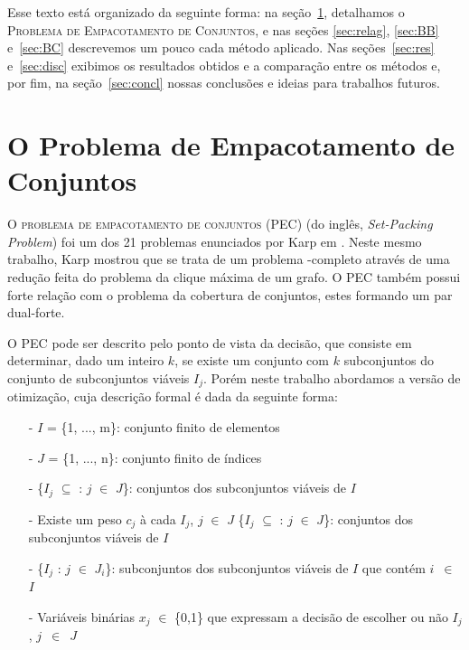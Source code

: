 \documentclass{article}
\begin{document}
	Esse texto está organizado da seguinte forma: na seção~\ref{sec:prob}, detalhamos o \textsc{Problema de Empacotamento de Conjuntos}, e nas seções \ref{sec:relag}, \ref{sec:BB} e~\ref{sec:BC} descrevemos um pouco cada método aplicado. Nas seções~\ref{sec:res} e~\ref{sec:disc} exibimos os resultados obtidos e a comparação entre os métodos e, por fim, na seção~\ref{sec:concl} nossas conclusões e ideias para trabalhos futuros.
	
	
	\section{O Problema de Empacotamento de Conjuntos}\label{sec:prob}
	O \textsc{problema de empacotamento de conjuntos} (PEC) (do inglês, \emph{Set-Packing Problem}) foi um dos 21 problemas enunciados por Karp em \cite{Karp}. Neste mesmo trabalho, Karp mostrou que se trata de um problema \NP-completo através de uma redução feita do problema da clique máxima de um grafo. O PEC também possui forte relação com o problema da cobertura de conjuntos, estes formando um par dual-forte.
	
	O PEC pode ser descrito pelo ponto de vista da decisão, que consiste em determinar, dado um inteiro $k$, se existe um conjunto com $k$ subconjuntos do conjunto de subconjuntos viáveis $I_j$.
	Porém neste trabalho abordamos a versão de otimização, cuja descrição formal é dada da seguinte forma:
	
	\begin{itemize}
	    \item[-] $I$ = \{1, ..., m\}: conjunto finito de elementos
	    
	    \item[-] $J$ = \{1, ..., n\}: conjunto finito de índices
	    
	    \item[-] \{$I_j$ $\subseteq$ : $j$ $\in$ $J$\}: conjuntos dos subconjuntos viáveis de $I$
	    
	    \item[-] Existe um peso $c_j$ à cada $I_j$, $j$ $\in$ $J$
	    \{$I_j$ $\subseteq$ : $j$ $\in$ $J$\}: conjuntos dos subconjuntos viáveis de $I$
	    
	    \item[-] \{$I_j$ : $j$ $\in$ $J_i$\}: subconjuntos dos subconjuntos viáveis de $I$ que contém $i$~$\in$~$I$
	    \item[-] Variáveis binárias $x_j$ $\in$ \{0,1\} que expressam a decisão de escolher ou não $I_j$, $j$~$\in$~$J$
	\end{itemize}
	
\end{document}
